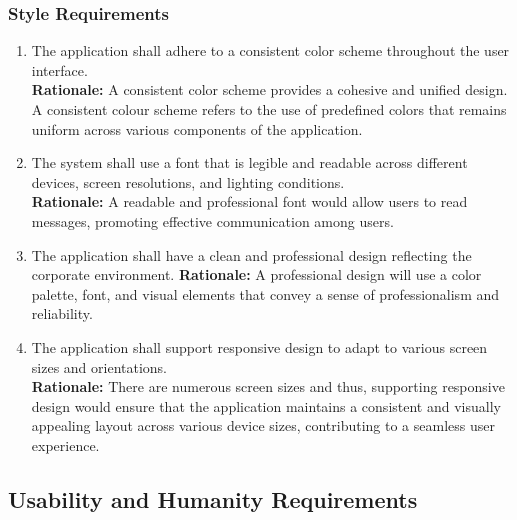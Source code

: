 \documentclass[]{article}
\begin{document}
\subsubsection{Style Requirements}
\label{ssub:style_requirements}
\begin{enumerate}[{LF-S}1. ]
    \item The application shall adhere to a consistent color scheme throughout the user interface. \\
    {\bf Rationale:} A consistent color scheme provides a cohesive and unified design. A consistent colour scheme
    refers to the use of predefined colors that remains uniform across various components of the application.
    \item The system shall use a font that is legible and readable across different devices, screen resolutions, and lighting conditions. \\
    {\bf Rationale:} A readable and professional font would allow users to read messages, promoting effective communication among users. 
    \item The application shall have a clean and professional design reflecting the corporate environment. 
    {\bf Rationale:} A professional design will use a color palette, font, and visual elements that convey a sense
    of professionalism and reliability.
    \item The application shall support responsive design to adapt to various screen sizes and orientations. \\
    {\bf Rationale:} There are numerous screen sizes and thus, supporting responsive design would ensure that the application 
    maintains a consistent and visually appealing layout across various device sizes, contributing to a seamless user experience.
\end{enumerate}

\subsection{Usability and Humanity Requirements}
\label{sub:usability_and_humanity_requirements}
\end{document}
